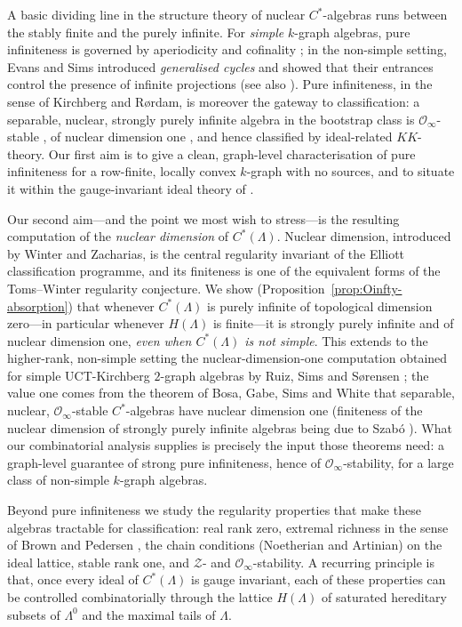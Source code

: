 \documentclass[12pt]{amsart}
\theoremstyle{plain}
\theoremstyle{definition}
\theoremstyle{remark}
\begin{document}
A basic dividing line in the structure theory of nuclear $C^*$-algebras runs
between the stably finite and the purely infinite. For \emph{simple} $k$-graph
algebras, pure infiniteness is governed by aperiodicity and cofinality
\cite{S,PSS4}; in the non-simple setting, Evans and Sims \cite{ES} introduced
\emph{generalised cycles} and showed that their entrances control the presence
of infinite projections (see also \cite{HS,PRRS}). Pure infiniteness, in the
sense of Kirchberg and R\o rdam, is moreover the gateway to classification: a
separable, nuclear, strongly purely infinite algebra in the bootstrap class is
$\mathcal O_\infty$-stable \cite{KR}, of nuclear dimension one \cite{BGSW}, and
hence classified by ideal-related $KK$-theory. Our first aim is to give a clean,
graph-level characterisation of pure infiniteness for a row-finite, locally
convex $k$-graph with no sources, and to situate it within the gauge-invariant
ideal theory of \cite{KaP,PSS2}.

Our second aim---and the point we most wish to stress---is the resulting
computation of the \emph{nuclear dimension} of $C^*(\Lambda)$. Nuclear
dimension, introduced by Winter and Zacharias, is the central regularity
invariant of the Elliott classification programme, and its finiteness is one of
the equivalent forms of the Toms--Winter regularity conjecture. We show
(Proposition~\ref{prop:Oinfty-absorption}) that whenever $C^*(\Lambda)$ is purely
infinite of topological dimension zero---in particular whenever $H(\Lambda)$ is
finite---it is strongly purely infinite and of nuclear dimension one,
\emph{even when $C^*(\Lambda)$ is not simple}. This extends to the higher-rank,
non-simple setting the nuclear-dimension-one computation obtained for simple
UCT-Kirchberg $2$-graph algebras by Ruiz, Sims and S\o rensen \cite{RSS}; the
value one comes from the theorem of Bosa, Gabe, Sims and White that separable,
nuclear, $\mathcal O_\infty$-stable $C^*$-algebras have nuclear dimension one
\cite{BGSW} (finiteness of the nuclear dimension of strongly purely infinite
algebras being due to Szab\'o \cite{Sz}). What our combinatorial analysis
supplies is precisely the input those theorems need: a graph-level guarantee of
strong pure infiniteness, hence of $\mathcal O_\infty$-stability, for a large
class of non-simple $k$-graph algebras.

Beyond pure infiniteness we study the regularity properties that make these
algebras tractable for classification: real rank zero, extremal richness in the
sense of Brown and Pedersen \cite{BP,BP2}, the chain conditions (Noetherian and
Artinian) on the ideal lattice, stable rank one, and $\mathcal Z$- and
$\mathcal O_\infty$-stability. A recurring principle is that, once every ideal
of $C^*(\Lambda)$ is gauge invariant, each of these properties can be controlled
combinatorially through the lattice $H(\Lambda)$ of saturated hereditary subsets
of $\Lambda^0$ and the maximal tails of $\Lambda$.
\end{document}
